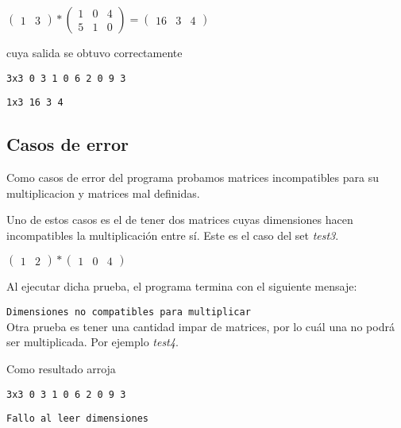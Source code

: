 \documentclass[10pt,a4paper]{article}
\begin{document}
		\begin{center}
		$\begin{pmatrix}
		1 & 3
		\end{pmatrix}
		*
		\begin{pmatrix}
		1 & 0 & 4 \\ 5 & 1 & 0
		\end{pmatrix}
		=
		\begin{pmatrix}
		16 & 3 & 4
		\end{pmatrix}
		$\end{center}
	
		cuya salida se obtuvo correctamente
	
		\texttt{3x3 0 3 1 0 6 2 0 9 3}

		\texttt{1x3 16 3 4}

	\subsection{Casos de error}
		Como casos de error del programa probamos matrices incompatibles para su multiplicacion y matrices mal definidas.

		Uno de estos casos es el de tener dos matrices cuyas dimensiones hacen incompatibles la multiplicación entre sí. Este es el caso del set \textit{test3}.

		
		\begin{center}
		$\begin{pmatrix}
		1 & 2
		\end{pmatrix}
		*
		\begin{pmatrix}
		1 & 0 & 4
		\end{pmatrix}
		$\end{center}

		Al ejecutar dicha prueba, el programa termina con el siguiente mensaje:

		\texttt{Dimensiones no compatibles para multiplicar}\\

		Otra prueba es tener una cantidad impar de matrices, por lo cuál una no podrá ser multiplicada. Por ejemplo \textit{test4}.

		
		
		Como resultado arroja

		\texttt{3x3 0 3 1 0 6 2 0 9 3}

		\texttt{Fallo al leer dimensiones}\\
\end{document}

